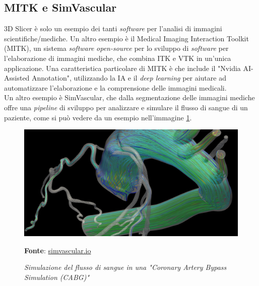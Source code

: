 \subsection{MITK e SimVascular}
3D Slicer è solo un esempio dei tanti \emph{software} per l'analisi di immagini scientifiche/mediche. Un altro esempio è il Medical Imaging Interaction Toolkit (MITK), un sistema \emph{software} \emph{open-source} per lo sviluppo di \emph{software} per l'elaborazione di immagini mediche, che combina ITK e VTK in un'unica applicazione. Una caratteristica particolare di MITK è che include il "Nvidia AI-Assisted Annotation", utilizzando la IA e il \emph{deep learning} per aiutare ad automatizzare l'elaborazione e la comprensione delle immagini medicali.
\\
Un altro esempio è SimVascular, che dalla segmentazione delle immagini mediche offre una \emph{pipeline} di sviluppo per analizzare e simulare il flusso di sangue di un paziente, come si può vedere da un esempio nell'immagine \ref{fig: SimVascular}.

\begin{figure}[h]
    \centering
    \includegraphics[scale=0.2]{immagini/volumerendering/simvascular.png}
    \caption{\textit{Simulazione del flusso di sangue in una "Coronary Artery Bypass Simulation (CABG)"}}
    \textbf{Fonte}: \href{http://simvascular.github.io/}{simvascular.io}
    \label{fig: SimVascular}
\end{figure}



